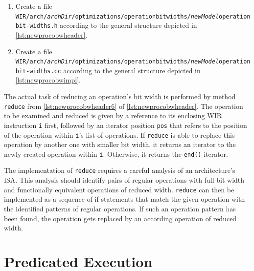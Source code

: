 \begin{enumerate}
\begin{lstlisting}[style=code,float=!ht,xleftmargin=10mm,aboveskip=-0.8 \baselineskip,belowskip=-0.8 \baselineskip]
Ü{\itshape archDir}Üobwincludedir       = ${includedir}/arch/Ü{\itshape archDir}Ü/optimizations/operationbitwidths
Ü{\itshape archDir}Üobwinclude_HEADERS  = arch/Ü{\itshape archDir}Ü/optimizations/operationbitwidths/Ü{\itshape newModel}Üoperationbitwidths.h
\end{lstlisting}

  \item Create a file \texttt{WIR/arch/{\itshape archDir}/optimizations/operationbitwidths/{\itshape newModel}operationbit-\linebreak widths.h} according to the general structure depicted in \cref{lst:newprocobwheader}.

  \item Create a file \texttt{WIR/arch/{\itshape archDir}/optimizations/operationbitwidths/{\itshape newModel}operationbit-\linebreak widths.cc} according to the general structure depicted in \cref{lst:newprocobwimpl}.
\end{enumerate}

The actual task of reducing an operation's bit width is performed by method \texttt{reduce} from \cref{lst:newprocobwheader6} of \cref{lst:newprocobwheader}.
The operation to be examined and reduced is given by a reference to its enclosing \gls{WIR} instruction \texttt{i} first, followed by an iterator position \texttt{pos} that refers to the position of the operation within \texttt{i}'s list of operations.
If \texttt{reduce} is able to replace this operation by another one with smaller bit width, it returns an iterator to the newly created operation within \texttt{i}.
Otherwise, it returns the \texttt{end()} iterator.

The implementation of \texttt{reduce} requires a careful analysis of an architecture's \gls{ISA}.
This analysis should identify pairs of regular operations with full bit width and functionally equivalent operations of reduced width.
\texttt{reduce} can then be implemented as a sequence of if-statements that match the given operation with the identified patterns of regular operations.
If such an operation pattern has been found, the operation gets replaced by an according operation of reduced width.


\section{Predicated Execution}
\label{sec:optpredexretarget}

